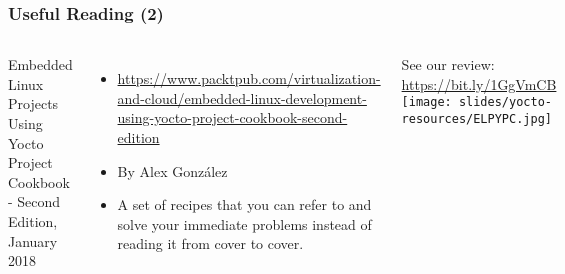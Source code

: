 \begin{frame}
  \frametitle{Useful Reading (2)}
  \begin{columns}
    Embedded Linux Projects Using Yocto Project Cookbook - Second Edition, January 2018
    \begin{itemize}
    \item \url{https://www.packtpub.com/virtualization-and-cloud/embedded-linux-development-using-yocto-project-cookbook-second-edition}
    \item By Alex González
    \item A set of recipes that you can refer to and solve your
          immediate problems instead of reading it from cover to cover. 
    \end{itemize}
    See our review: \url{https://bit.ly/1GgVmCB}
    \texttt{[image: slides/yocto-resources/ELPYPC.jpg]}
  \end{columns}
\end{frame}

